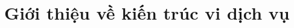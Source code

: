 \documentclass{report} %
\begin{document}


















\section{Giới thiệu về kiến trúc vi dịch vụ}


% 


% 

\end{document}

